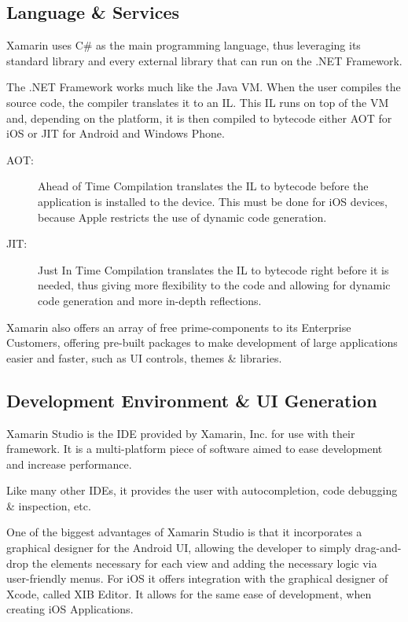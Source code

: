 \subsection{Language \& Services}
Xamarin uses C\# as the main programming language, thus leveraging its standard library and every external library that can run on the .NET Framework.

The .NET Framework works much like the Java \ac{VM}. When the user compiles the source code, the compiler translates it to an \ac{IL}. This \ac{IL} runs on top of the \ac{VM} and, depending on the platform, it is then compiled to bytecode either \ac{AOT} for iOS or \ac{JIT} for Android and Windows Phone.

\begin{description}
\item[AOT:] Ahead of Time Compilation translates the \ac{IL} to bytecode before the application is installed to the device. This must be done for iOS devices, because Apple restricts the use of dynamic code generation.
\item[JIT:] Just In Time Compilation translates the \ac{IL} to bytecode right before it is needed, thus giving more flexibility to the code and allowing for dynamic code generation and more in-depth reflections. 
\end{description}   

Xamarin also offers an array of free prime-components to its Enterprise Customers, offering pre-built packages to make development of large applications easier and faster, such as \ac{UI} controls, themes \& libraries.

\subsection{Development Environment \& UI Generation}
Xamarin Studio is the \ac{IDE} provided by Xamarin, Inc. for use with their framework. It is a multi-platform piece of software aimed to ease development and increase performance.

Like many other \ac{IDE}s, it provides the user with autocompletion, code debugging \& inspection, etc.

One of the biggest advantages of Xamarin Studio is that it incorporates a graphical designer for the Android \ac{UI}, allowing the developer to simply drag-and-drop the elements necessary for each view and adding the necessary logic via user-friendly menus. For iOS it offers integration with the graphical designer of Xcode, called XIB Editor. It allows for the same ease of development, when creating iOS Applications. 


